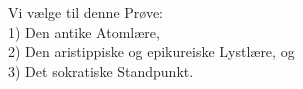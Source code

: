 Vi vælge til denne Prøve:\\
\hspace*{\parindent}1) Den antike Atomlære,\\
\hspace*{\parindent}2) Den aristippiske og epikureiske Lystlære, og\\
\hspace*{\parindent}3) Det sokratiske Standpunkt.

\divrule


